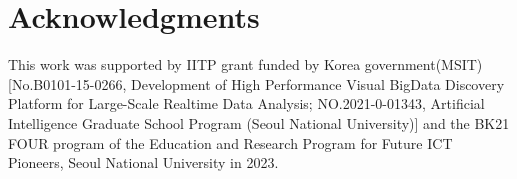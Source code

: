 \section*{Acknowledgments}
This work was supported by IITP grant funded by Korea government(MSIT) [No.B0101-15-0266, Development of High Performance Visual BigData Discovery Platform for Large-Scale Realtime Data Analysis; NO.2021-0-01343, Artificial Intelligence Graduate School Program (Seoul National University)] and the BK21 FOUR program of the Education and Research Program for Future ICT Pioneers, Seoul National University in 2023.